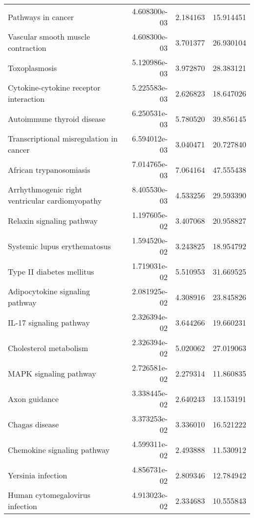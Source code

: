 \begin{tabular}{lrrr}
                                Pathways in cancer &      4.608300e-03 &  2.184163 &       15.914451 \\
                Vascular smooth muscle contraction &      4.608300e-03 &  3.701377 &       26.930104 \\
                                     Toxoplasmosis &      5.120986e-03 &  3.972870 &       28.383121 \\
            Cytokine-cytokine receptor interaction &      5.225583e-03 &  2.626823 &       18.647026 \\
                        Autoimmune thyroid disease &      6.250531e-03 &  5.780520 &       39.856145 \\
           Transcriptional misregulation in cancer &      6.594012e-03 &  3.040471 &       20.727840 \\
                           African trypanosomiasis &      7.014765e-03 &  7.064164 &       47.555438 \\
   Arrhythmogenic right ventricular cardiomyopathy &      8.405530e-03 &  4.533256 &       29.593390 \\
                         Relaxin signaling pathway &      1.197605e-02 &  3.407068 &       20.958827 \\
                      Systemic lupus erythematosus &      1.594520e-02 &  3.243825 &       18.954792 \\
                         Type II diabetes mellitus &      1.719031e-02 &  5.510953 &       31.669525 \\
                   Adipocytokine signaling pathway &      2.081925e-02 &  4.308916 &       23.845826 \\
                           IL-17 signaling pathway &      2.326394e-02 &  3.644266 &       19.660231 \\
                            Cholesterol metabolism &      2.326394e-02 &  5.020062 &       27.019063 \\
                            MAPK signaling pathway &      2.726581e-02 &  2.279314 &       11.860835 \\
                                     Axon guidance &      3.338445e-02 &  2.640243 &       13.153191 \\
                                    Chagas disease &      3.373253e-02 &  3.336010 &       16.521222 \\
                       Chemokine signaling pathway &      4.599311e-02 &  2.493888 &       11.530912 \\
                                Yersinia infection &      4.856731e-02 &  2.809346 &       12.784942 \\
                   Human cytomegalovirus infection &      4.913023e-02 &  2.334683 &       10.555843 \\
\bottomrule
\end{tabular}
